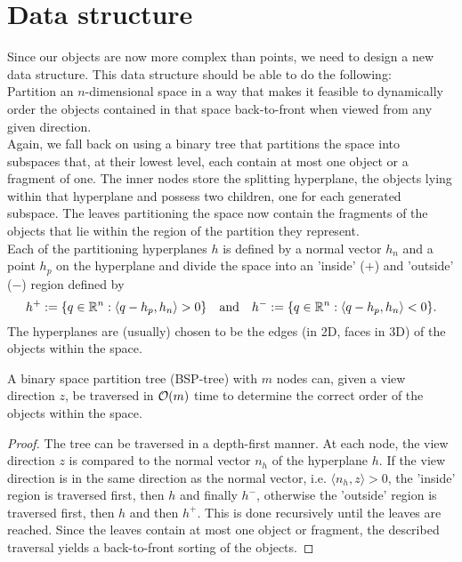 \section{Data structure}
    Since our objects are now more complex than points, we need to design a new data structure. This data structure should be able to do the following: \\
    Partition an $n$-dimensional space in a way that makes it feasible to dynamically order the objects contained in that space back-to-front when viewed from any given direction. \\
    Again, we fall back on using a binary tree that partitions the space into subspaces that, at their lowest level, each contain at most one object or a fragment of one. The inner nodes store the splitting hyperplane, the objects lying within that hyperplane and possess two children, one for each generated subspace. The leaves partitioning the space now contain the fragments of the objects that lie within the region of the partition they represent. \\
    Each of the partitioning hyperplanes $h$ is defined by a normal vector $h_n$ and a point $h_p$ on the hyperplane and divide the space into an 'inside' ($+$) and 'outside' ($-$) region defined by
    $$h^+ := \{q \in \mathbb{R}^n : \langle q - h_p, h_n \rangle > 0\} \quad\text{and}\quad h^- := \{q \in \mathbb{R}^n : \langle q - h_p, h_n \rangle < 0\}.$$
    The hyperplanes are (usually) chosen to be the edges (in 2D, faces in 3D) of the objects within the space.

    \begin{proposition}
        A binary space partition tree (BSP-tree) with $m$ nodes can, given a view direction $z$, be traversed in $\mathcal{O}(m)$ time to determine the correct order of the objects within the space.
    \end{proposition}
    \begin{proof}
        The tree can be traversed in a depth-first manner. At each node, the view direction $z$ is compared to the normal vector $n_h$ of the hyperplane $h$. If the view direction is in the same direction as the normal vector, i.e. $\langle n_h, z \rangle > 0$, the 'inside' region is traversed first, then $h$ and finally $h^-$, otherwise the 'outside' region is traversed first, then $h$ and then $h^+$. This is done recursively until the leaves are reached. Since the leaves contain at most one object or fragment, the described traversal yields a back-to-front sorting of the objects.
    \end{proof}

